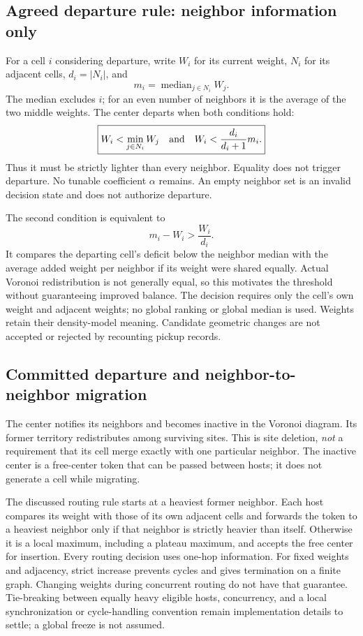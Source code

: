 \subsection{Agreed departure rule: neighbor information only}
For a cell $i$ considering departure, write $W_i$ for its current weight,
$N_i$ for its adjacent cells, $d_i=|N_i|$, and
\[
 m_i=\operatorname{median}_{j\in N_i} W_j.
\]
The median excludes $i$; for an even number of neighbors it is the average
of the two middle weights. The center departs when both conditions hold:
\[
 \boxed{W_i<\min_{j\in N_i}W_j\quad\hbox{and}\quad
 W_i<\frac{d_i}{d_i+1}m_i.}
\]
Thus it must be strictly lighter than every neighbor. Equality does not trigger
departure. No tunable coefficient $\alpha$ remains. An empty neighbor set is
an invalid decision state and does not authorize departure.

The second condition is equivalent to
\[
 m_i-W_i>\frac{W_i}{d_i}.
\]
It compares the departing cell's deficit below the neighbor median with the
average added weight per neighbor if its weight were shared equally. Actual
Voronoi redistribution is not generally equal, so this motivates the threshold
without guaranteeing improved balance. The decision requires only the cell's
own weight and adjacent weights; no global ranking or global median is used.
Weights retain their density-model meaning. Candidate geometric changes are
not accepted or rejected by recounting pickup records.

\subsection{Committed departure and neighbor-to-neighbor migration}
The center notifies its neighbors and becomes inactive in the Voronoi diagram.
Its former territory redistributes among surviving sites. This is site deletion,
\emph{not} a requirement that its cell merge exactly with one particular neighbor.
The inactive center is a free-center token that can be passed between hosts;
it does not generate a cell while migrating.

The discussed routing rule starts at a heaviest former neighbor. Each host
compares its weight with those of its own adjacent cells and forwards the token
to a heaviest neighbor only if that neighbor is strictly heavier than itself.
Otherwise it is a local maximum, including a plateau maximum, and accepts the
free center for insertion. Every routing decision uses one-hop information.
For fixed weights and adjacency, strict increase prevents cycles and gives
termination on a finite graph. Changing weights during concurrent routing do
not have that guarantee. Tie-breaking between equally heavy eligible hosts,
concurrency, and a local synchronization or cycle-handling convention remain
implementation details to settle; a global freeze is not assumed.

